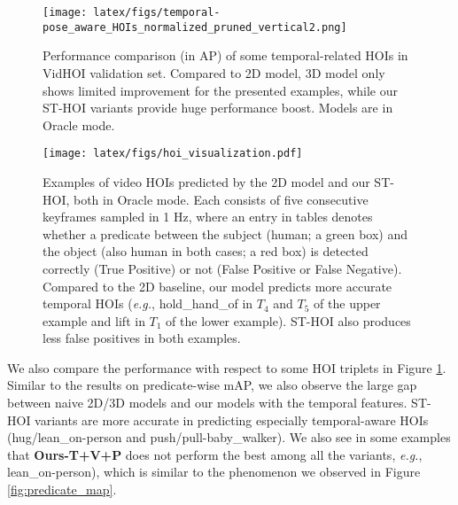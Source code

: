 \documentclass[sigconf]{acmart}
\begin{document}
\begin{figure}[t!]
\centering
\texttt{[image: latex/figs/temporal-pose\_aware\_HOIs\_normalized\_pruned\_vertical2.png]}
\vspace{-1.3em}
\caption{
Performance comparison (in AP) of some temporal-related HOIs in VidHOI validation set.
Compared to 2D model, 3D model only shows limited improvement for the presented examples, while our ST-HOI variants provide huge performance boost.
Models are in {\selectfont Oracle} mode.
}
\vspace{-1.5em}
\label{fig:hoi_examples}
\end{figure}

\begin{figure*}[t!]
\centering
\texttt{[image: latex/figs/hoi\_visualization.pdf]}
\vspace{-1.3em}
\caption{Examples of video HOIs predicted by the 2D model \cite{wan2019pose} and our ST-HOI, both in {\selectfont Oracle} mode.
Each consists of five consecutive keyframes sampled in 1 Hz, where an entry in tables denotes whether a predicate between the subject (human; a green box) and the object (also human in both cases; a red box) is detected correctly (True Positive) or not (False Positive or False Negative).
Compared to the 2D baseline, our model predicts more accurate temporal HOIs (\emph{e.g.}, {\selectfont hold\_hand\_of} in $T_4$ and $T_5$ of the upper example and {\selectfont lift} in $T_1$ of the lower example).
ST-HOI also produces less false positives in both examples.
}
\vspace{-1em}
\label{fig:hoi_visualization}
\end{figure*}

We also compare the performance with respect to some HOI triplets in Figure \ref{fig:hoi_examples}.
Similar to the results on predicate-wise mAP, we also observe the large gap between naive 2D/3D models and our models with the temporal features. 
ST-HOI variants are more accurate in predicting especially temporal-aware HOIs ({\selectfont hug/lean\_on-person} and {\selectfont push/pull-baby\_walker}).
We also see in some examples that \textbf{Ours-T+V+P} does not perform the best among all the variants, \emph{e.g.}, {\selectfont lean\_on-person}), which is similar to the phenomenon we observed in Figure \ref{fig:predicate_map}.
\end{document}
